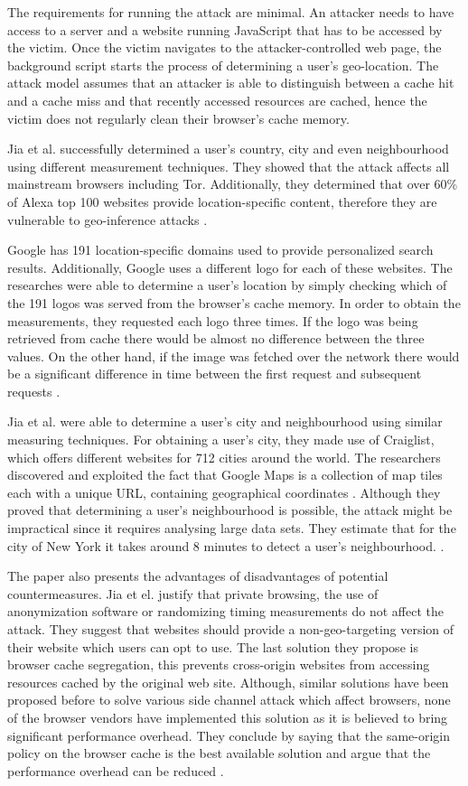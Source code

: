 \documentclass[10pt,a4paper,twoside]{book}
\begin{document}
The requirements for running the attack are minimal. An attacker needs to have access to a server and a website running JavaScript that has to be accessed by the victim. Once the victim navigates to the attacker-controlled web page, the background script starts the process of determining a user's geo-location. The attack model assumes that an attacker is able to distinguish between a cache hit and a cache miss and that recently accessed resources are cached, hence the victim does not regularly clean their browser's cache memory.

Jia et al. successfully determined a user's country, city and even neighbourhood using different measurement techniques. They showed that the attack affects all mainstream browsers including Tor. Additionally, they determined that over 60\% of Alexa top 100 websites provide location-specific content, therefore they are vulnerable to geo-inference attacks \cite{jia2015know}.

Google has 191 location-specific domains used to provide personalized search results. Additionally, Google uses a different logo for each of these websites. The researches were able to determine a user's location by simply checking which of the 191 logos was served from the browser's cache memory. In order to obtain the measurements, they requested each logo three times. If the logo was being retrieved from cache there would be almost no difference between the three values. On the other hand, if the image was fetched over the network there would be a significant difference in time between the first request and subsequent requests \cite{jia2015know}.

Jia et al. were able to determine a user's city and neighbourhood using similar measuring techniques. For obtaining a user's city, they made use of Craiglist, which offers different websites for 712 cities around the world. The researchers discovered and exploited the fact that Google Maps is a collection of map tiles each with a unique URL, containing geographical coordinates \cite{jia2015know}. Although they proved that determining a user's neighbourhood is possible, the attack might be impractical since it requires analysing large data sets. They estimate that for the city of New York it takes around 8 minutes to detect a user's neighbourhood. \cite{jia2015know}.

The paper also presents the advantages of disadvantages of potential countermeasures. Jia et el. justify that private browsing, the use of anonymization software or randomizing timing measurements do not affect the attack. They suggest that websites should provide a non-geo-targeting version of their website which users can opt to use. The last solution they propose is browser cache segregation, this prevents cross-origin websites from accessing resources cached by the original web site. Although, similar solutions have been proposed before to solve various side channel attack which affect browsers, none of the browser vendors have implemented this solution as it is believed to bring significant performance overhead. They conclude by saying that the same-origin policy on the browser cache is the best available solution and argue that the performance overhead can be reduced \cite{jia2015know}.
\end{document}
